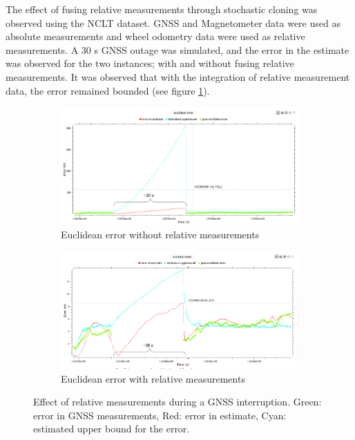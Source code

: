 The effect of fusing relative measurements through stochastic cloning was observed using the \gls{NCLT} dataset. \gls{GNSS} and Magnetometer data were used as absolute measurements and wheel odometry data were used as relative measurements. A 30 s \gls{GNSS} outage was simulated, and the error in the estimate was observed for the two instances; with and without fusing relative measurements. It was observed that with the integration of relative measurement data, the error remained bounded (see figure \ref{fig:pa:relativeMeasurements}).
\begin{figure}[htp]
	\centering
    \begin{subfigure}{\textwidth}
        \includegraphics[width=\textwidth]{figs/euclidean-error-wo-rm.png}
        \caption{Euclidean error without relative measurements}
    \end{subfigure}
    \begin{subfigure}{\textwidth}
        \includegraphics[width=\textwidth]{figs/euclidean-error-with-rm.png}
        \caption{Euclidean error with relative measurements}
    \end{subfigure}
    \caption[Effect of relative measurements]{Effect of relative measurements during a GNSS interruption. Green: error in GNSS measurements, Red: error in estimate, Cyan: estimated upper bound for the error.}
    \label{fig:pa:relativeMeasurements}
    \vspace{0.5cm}
\end{figure}

